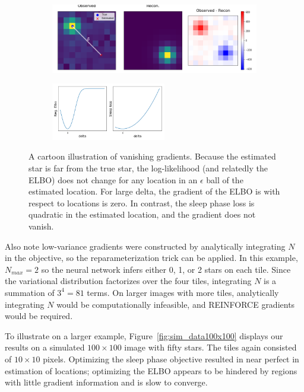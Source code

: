 \begin{figure}[!htb]
    \centering
    \begin{subfigure}[t]{0.8\textwidth}
    \centering
    \includegraphics[width=\textwidth]{figures/gradzero_cartoon.png}
    \end{subfigure}
    \begin{subfigure}[t]{\textwidth}
    \centering
    \includegraphics[width=0.55\textwidth]{figures/gradzero_cartoon2.png}
    \end{subfigure}
    \vspace{-3em}
    \caption{A cartoon illustration of vanishing gradients. Because the estimated star is far from the true star, the log-likelihood (and relatedly the ELBO) does not change for any location in an $\epsilon$ ball of the estimated location. 
    For large delta, the gradient of the ELBO is with respect to locations is zero. In contrast, the sleep phase loss is quadratic in the estimated location, and the gradient does not vanish. }
    \label{fig:gradzero_cartoon}
\end{figure}

Also note low-variance gradients were constructed by analytically integrating $N$ in the objective, so the reparameterization trick can be applied. 
In this example, $N_{max} = 2$ so the neural network infers either 0, 1, or 2 stars on each tile. 
Since the variational distribution factorizes over the four tiles, integrating $N$ is a summation of $3^4 = 81$ terms.
On larger images with more tiles, analytically integrating $N$ would be computationally infeasible, and REINFORCE gradients would be required. 

To illustrate on a larger example, Figure~\ref{fig:sim_data100x100} displays our results on a simulated $100\times 100$ image with fifty stars. The tiles again consisted of $10\times 10$ pixels. Optimizing the sleep phase objective resulted in near perfect in estimation of locations; optimizing the ELBO appears to be hindered by regions with little gradient information and is slow to converge. 

